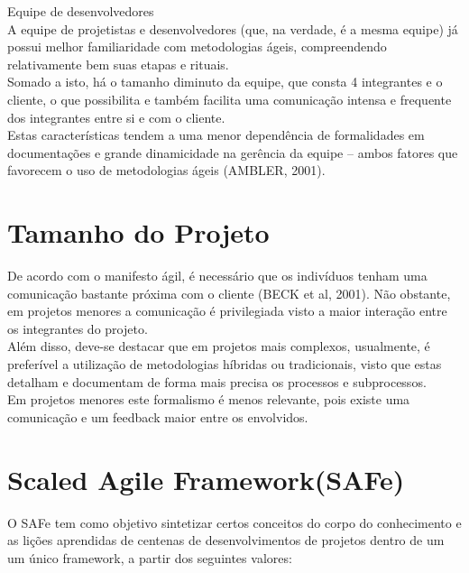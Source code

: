 \large{Equipe de desenvolvedores\\


\tab A equipe de projetistas e desenvolvedores (que, na verdade, é a mesma equipe) já possui melhor familiaridade com metodologias ágeis, compreendendo relativamente bem suas etapas e rituais. \\
\tab Somado a isto, há o tamanho diminuto da equipe, que consta 4 integrantes e o cliente, o que possibilita e também facilita uma comunicação intensa e frequente dos integrantes entre si e com o cliente. \\
\tab Estas características tendem a uma menor dependência de formalidades em documentações e grande dinamicidade na gerência da equipe – ambos fatores que favorecem o uso de metodologias ágeis (AMBLER, 2001). \\

	\large{\section {Tamanho do Projeto\\}}



\tab De acordo com o manifesto ágil, é necessário que os indivíduos tenham uma comunicação bastante próxima com o cliente (BECK et al, 2001). Não obstante, em projetos menores a comunicação é privilegiada visto a maior interação entre os integrantes do projeto. \\
\tab Além disso, deve-se destacar que em projetos mais complexos, usualmente,  é preferível a utilização de metodologias híbridas ou tradicionais, visto que estas detalham e documentam de forma mais precisa os processos e subprocessos. \\
\tab Em projetos menores este formalismo é menos relevante, pois existe uma comunicação e um feedback maior entre os envolvidos. \\

	\large{\section {Scaled Agile Framework(SAFe)\\}}



\tab O SAFe  tem como objetivo sintetizar certos conceitos do corpo do conhecimento e as lições aprendidas de centenas de desenvolvimentos de projetos  dentro de um um único framework, a partir dos seguintes valores:\\

}
